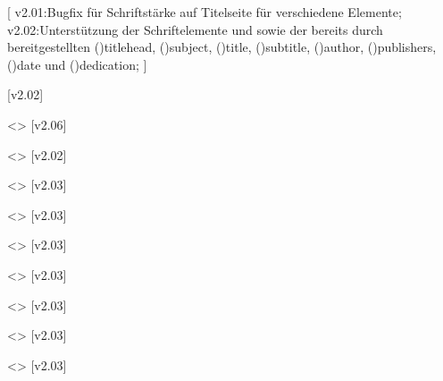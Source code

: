 \begin{DeclareEntity*}{}
\begin{DeclareEntity*}{}
\begin{DeclareEntity*}{}
\begin{Declaration}
  {}
  [
    v2.01:Bugfix für Schriftstärke auf Titelseite für verschiedene Elemente;
    v2.02:Unterstützung der Schriftelemente  und 
      sowie der bereits durch \KOMAScript bereitgestellten 
      \Font*(){titlehead}, 
      \Font*(){subject}, 
      \Font*(){title}, 
      \Font*(){subtitle}, 
      \Font*(){author}, 
      \Font*(){publishers}, 
      \Font*(){date} und 
      \Font*(){dedication};
  ]
\begin{Declaration}
  {}
  [v2.02]
\begin{Declaration}
  {}
  <>
  [v2.06]
\begin{Declaration}
  {}
  <>
  [v2.02]
\begin{Declaration}
  {}
  <>
  [v2.03]
\begin{Declaration}
  {}
  <>
  [v2.03]
\begin{Declaration}
  {}
  <>
  [v2.03]
\begin{Declaration}
  {}
  <>
  [v2.03]
\begin{Declaration}
  {}
  <>
  [v2.03]
\begin{Declaration}
  {}
  <>
  [v2.03]
\begin{Declaration}
  {}
  <>
  [v2.03]


\end{Declaration}
\end{Declaration}
\end{Declaration}
\end{Declaration}
\end{Declaration}
\end{Declaration}
\end{Declaration}
\end{Declaration}
\end{Declaration}
\end{Declaration}
\end{Declaration}
\end{DeclareEntity*}
\end{DeclareEntity*}
\end{DeclareEntity*}
